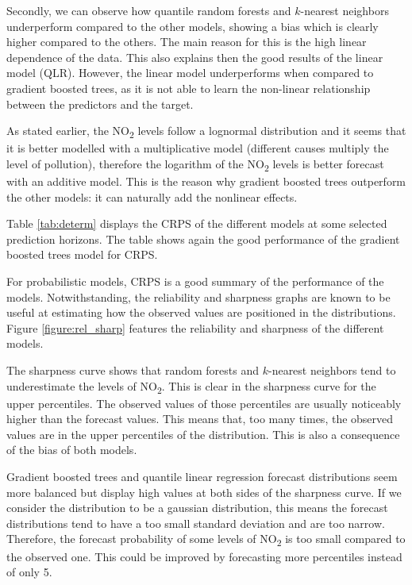 \documentclass[a4paper,twocolumn,5p]{elsarticle}
\begin{document}
Secondly, we can observe how quantile random forests and $k$-nearest
neighbors underperform compared to the other models, showing a bias
which is clearly higher compared to the others.  The main reason for
this is the high linear dependence of the data. This also explains
then the good results of the linear model (QLR).  However, the linear
model underperforms when compared to gradient boosted trees, as it is
not able to learn the non-linear relationship between the predictors
and the target.

As stated earlier, the NO\textsubscript{2} levels follow a lognormal
distribution and it seems that it is better modelled with a
multiplicative model (different causes multiply the level of
pollution), therefore the logarithm of the NO\textsubscript{2} levels
is better forecast with an additive model. This is the reason why
gradient boosted trees outperform the other models: it can naturally
add the nonlinear effects.

Table \ref{tab:determ} displays the CRPS of the different models at
some selected prediction horizons. The table shows again the good
performance of the gradient boosted trees model for CRPS.

For probabilistic models, CRPS is a good summary of the performance of
the models. Notwithstanding, the reliability and sharpness graphs are
known to be useful at estimating how the observed values are
positioned in the distributions.  Figure \ref{figure:rel_sharp}
features the reliability and sharpness of the different models.

The sharpness curve shows that random forests and $k$-nearest
neighbors tend to underestimate the levels of
NO\textsubscript{2}. This is clear in the sharpness curve for the
upper percentiles. The observed values of those percentiles are
usually noticeably higher than the forecast values. This means that,
too many times, the observed values are in the upper percentiles of
the distribution. This is also a consequence of the bias of both
models.

Gradient boosted trees and quantile linear regression forecast
distributions seem more balanced but display high values at both sides
of the sharpness curve.  If we consider the distribution to be a
gaussian distribution, this means the forecast distributions tend to
have a too small standard deviation and are too narrow. Therefore, the
forecast probability of some levels of NO\textsubscript{2} is too
small compared to the observed one.  This could be improved by
forecasting more percentiles instead of only 5.
\end{document}
